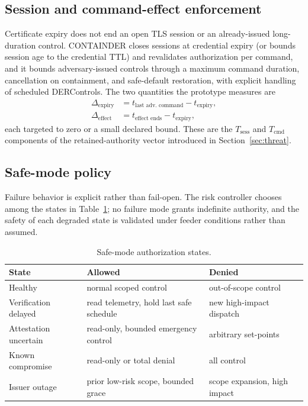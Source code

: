 \subsection{Session and command-effect enforcement}
Certificate expiry does not end an open TLS session or an already-issued long-duration control.
CONTAINDER closes sessions at credential expiry (or bounds session age to the credential TTL) and
revalidates authorization per command, and it bounds adversary-issued controls through a maximum
command duration, cancellation on containment, and safe-default restoration, with explicit
handling of scheduled DERControls. The two quantities the prototype measures are
\begin{align}
\Delta_{\mathrm{expiry}} &= t_{\text{last adv.\ command}} - t_{\text{expiry}},\\
\Delta_{\mathrm{effect}}  &= t_{\text{effect ends}} - t_{\text{expiry}},
\end{align}
each targeted to zero or a small declared bound. These are the $T_{\mathrm{sess}}$ and
$T_{\mathrm{cmd}}$ components of the retained-authority vector introduced in
Section~\ref{sec:threat}.

\subsection{Safe-mode policy}
Failure behavior is explicit rather than fail-open. The risk controller chooses among the states
in Table~\ref{tab:safemode}; no failure mode grants indefinite authority, and the safety of each
degraded state is validated under feeder conditions rather than assumed.

\begin{table}[t]
\centering
\caption{Safe-mode authorization states.}
\label{tab:safemode}
\small
\begin{tabular}{@{}p{}p{}p{}@{}}
\toprule
State & Allowed & Denied \\
\midrule
Healthy & normal scoped control & out-of-scope control \\
Verification delayed & read telemetry, hold last safe schedule & new high-impact dispatch \\
Attestation uncertain & read-only, bounded emergency control & arbitrary set-points \\
Known compromise & read-only or total denial & all control \\
Issuer outage & prior low-risk scope, bounded grace & scope expansion, high impact \\
\bottomrule
\end{tabular}
\end{table}

